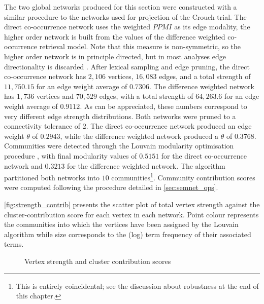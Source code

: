 The two global networks produced for this section were constructed with a similar procedure to the networks used for projection of the Crouch trial.
The direct co-occurrence network uses the weighted $PPMI$ as its edge modality, the higher order network is built from the values of the difference weighted co-occurrence retrieval model.
Note that this measure is non-symmetric, so the higher order network is in principle directed, but in most analyses edge directionality is discarded
.
After lexical sampling and edge pruning, the direct co-occurrence network has $2,106$ vertices, $16,083$ edges, and a total strength of $11,750.15$ for an edge weight average of $0.7306$.
The difference weighted network has $1,736$ vertices and $70,529$ edges, with a total strength of $64,263.6$ for an edge weight average of $0.9112$.
As can be appreciated, these numbers correspond to very different edge strength distributions.
Both networks were pruned to a connectivity tolerance of $2$.
The direct co-occurrence network produced an edge weight $\theta$ of $0.2943$, while the difference weighted network produced a $\theta$ of $0.3768$.
Communities were detected through the Louvain modularity optimisation procedure \citep{blondel2008}, with final modularity values of $0.5151$ for the direct co-occurrence network and $0.3213$ for the difference weighted network.
The algorithm partitioned both networks into $10$ communities\footnote{
    This is entirely coincidental; see the discussion about robustness at the end of this chapter.
}.
Community contribution scores were computed following the procedure detailed in \autoref{sec:semnet_ops}.

\autoref{fig:strength_contrib} presents the scatter plot of total vertex strength against the cluster-contribution score for each vertex in each network.
Point colour represents the communities into which the vertices have been assigned by the Louvain algorithm while size corresponds to the (log) term frequency of their associated terms.

\begin{figure}
    \centerfloat
    
    \caption{Vertex strength and cluster contribution scores}
    \label{fig:strength_contrib}
\end{figure}


